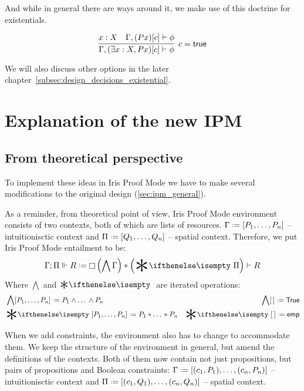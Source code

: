 And while in general there are ways around it, we make use of this doctrine for existentials.

\[
\infer[c = \true]
      {\Gamma, (\exists x : X, P x)[c] \vdash \phi}
      {x : X &
       \Gamma, (P x)[c] \vdash \phi}
\]

We will also discuss other options in the later chapter~\ref{subsec:design_decisions_existential}.


\section{Explanation of the new IPM}

\subsection{From theoretical perspective}

To implement these ideas in Iris Proof Mode we have to make several modifications to the original design (\ref{sec:ipm_general}).

As a reminder, from theoretical point of view, Iris Proof Mode environment consists of two contexts, both of which are lists of resources.
\(\IntuD \defeq [\dd P n]\) -- intuitionisctic context and \(\SpatD \defeq [\dd Q n]\) -- spatial context.
Therefore, we put Iris Proof Mode entailment to be: \[\entailsD R \defeq \intuit \left(\bigwedge \IntuD\right) * \left(\Sep \SpatD\right) \vdash R\]
Where \(\bigwedge\) and \(\Sep\) are iterated operations:
\begin{align*}
  & \bigwedge  [\dd P n] \defeq P_1 \wedge \dots\, \wedge P_n
  & \bigwedge [\,] \defeq \True \\
  & \Sep {[\dd P n]} \defeq P_1 * \dots\, * P_n
  & \Sep {[\,]} \defeq \emp
\end{align*}

When we add constraints, the environment also has to change to accommodate them.
We keep the structure of the environment in general, but amend the definitions of the contexts.
Both of them now contain not just propositions, but pairs of propositions and Boolean constraints:
\(\IntuD \defeq [(c_1,P_1),\dots,(c_n,P_n)]\) -- intuitionisctic context and \(\SpatD \defeq [(c_1,Q_1),\dots,(c_n,Q_n)]\) -- spatial context.

